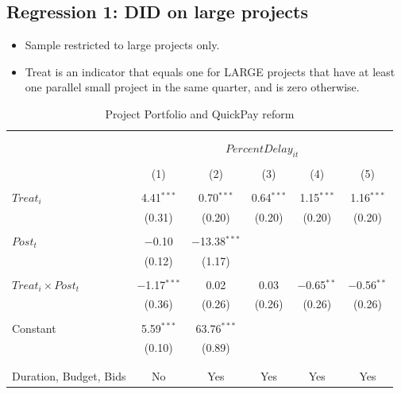 \documentclass[
]{article}
\providecommand{\tightlist}{%
  \setlength{\itemsep}{0pt}\setlength{\parskip}{0pt}}
\begin{document}
\hypertarget{regression-1-did-on-large-projects}{%
\subsection{Regression 1: DID on large
projects}\label{regression-1-did-on-large-projects}}

\begin{itemize}
\tightlist
\item
  Sample restricted to large projects only.
\item
  Treat is an indicator that equals one for LARGE projects that have at
  least one parallel small project in the same quarter, and is zero
  otherwise.
\end{itemize}

\begin{table}[H] \centering 
  \caption{Project Portfolio and QuickPay reform} 
  \label{} 
\small 
\begin{tabular}{@{\extracolsep{-10pt}}lccccc} 
\\[-1.8ex]\hline 
\hline \\[-1.8ex] 
\\[-1.8ex] & \multicolumn{5}{c}{$PercentDelay_{it}$} \\ 
\\[-1.8ex] & (1) & (2) & (3) & (4) & (5)\\ 
\hline \\[-1.8ex] 
 $Treat_i$ & 4.41$^{***}$ & 0.70$^{***}$ & 0.64$^{***}$ & 1.15$^{***}$ & 1.16$^{***}$ \\ 
  & (0.31) & (0.20) & (0.20) & (0.20) & (0.20) \\ 
  & & & & & \\ 
 $Post_t$ & $-$0.10 & $-$13.38$^{***}$ &  &  &  \\ 
  & (0.12) & (1.17) &  &  &  \\ 
  & & & & & \\ 
 $Treat_i \times Post_t$ & $-$1.17$^{***}$ & 0.02 & 0.03 & $-$0.65$^{**}$ & $-$0.56$^{**}$ \\ 
  & (0.36) & (0.26) & (0.26) & (0.26) & (0.26) \\ 
  & & & & & \\ 
 Constant & 5.59$^{***}$ & 63.76$^{***}$ &  &  &  \\ 
  & (0.10) & (0.89) &  &  &  \\ 
  & & & & & \\ 
\hline \\[-1.8ex] 
Duration, Budget, Bids & No & Yes & Yes & Yes & Yes \\ 

\end{tabular}
\end{table}
\end{document}
